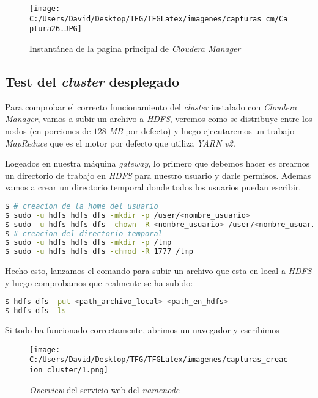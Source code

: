 \begin{figure}[!htpb]
  \centering
  \texttt{[image: C:/Users/David/Desktop/TFG/TFGLatex/imagenes/capturas\_cm/Captura26.JPG]}
  \caption[Instantánea \textit{Cloudera Manager}]{Instantánea de la pagina principal de \textit{Cloudera Manager}}
\end{figure}

\subsection{Test del \textit{cluster} desplegado}\label{test_cluster_desplegado}
Para comprobar el correcto funcionamiento del \textit{cluster} instalado con \textit{Cloudera Manager}, vamos a subir
un archivo a \textit{HDFS}, veremos como se distribuye entre los nodos (en porciones de $128$ \textit{MB} por defecto) 
y luego ejecutaremos un trabajo \textit{MapReduce} que es el motor por defecto que utiliza \textit{YARN v2}.

\clearpage

Logeados en nuestra máquina \textit{gateway}, lo primero que debemos hacer es crearnos un directorio de trabajo
en \textit{HDFS} para nuestro usuario y darle permisos. Ademas vamos a crear un directorio temporal donde
todos los usuarios puedan escribir.

\begin{lstlisting}[language=bash, numbers=none]
$ # creacion de la home del usuario
$ sudo -u hdfs hdfs dfs -mkdir -p /user/<nombre_usuario>
$ sudo -u hdfs hdfs dfs -chown -R <nombre_usuario> /user/<nombre_usuario>
$ # creacion del directorio temporal
$ sudo -u hdfs hdfs dfs -mkdir -p /tmp
$ sudo -u hdfs hdfs dfs -chmod -R 1777 /tmp
\end{lstlisting}

Hecho esto, lanzamos el comando para subir un archivo que esta en local a \textit{HDFS} y luego comprobamos
que realmente se ha subido:

\begin{lstlisting}[language=bash, numbers=none]
$ hdfs dfs -put <path_archivo_local> <path_en_hdfs>
$ hdfs dfs -ls
\end{lstlisting}

Si todo ha funcionado correctamente, abrimos un navegador y escribimos 

\begin{figure}[!htpb]
  \centering
  \texttt{[image: C:/Users/David/Desktop/TFG/TFGLatex/imagenes/capturas\_creacion\_cluster/1.png]}
  \caption[\textit{Overview web namenode}]{\textit{Overview} del servicio web del \textit{namenode}}
\end{figure}

